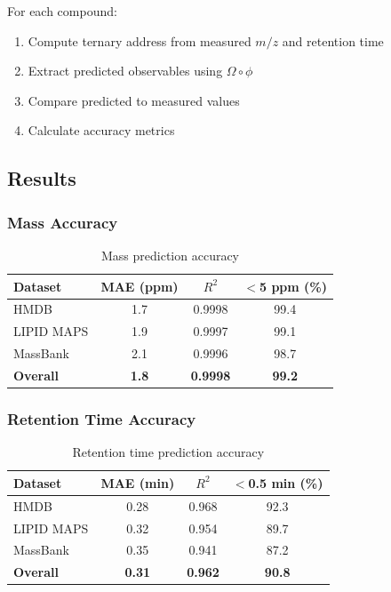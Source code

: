 \documentclass[twocolumn,10pt]{article}
\begin{document}
For each compound:

\begin{enumerate}
\item Compute ternary address from measured $m/z$ and retention time
\item Extract predicted observables using $\Omega \circ \phi$
\item Compare predicted to measured values
\item Calculate accuracy metrics
\end{enumerate}

\subsection{Results}

\subsubsection{Mass Accuracy}

\begin{table}[H]
\centering
\caption{Mass prediction accuracy}
\label{tab:mass_accuracy}
\begin{tabular}{lccc}
\toprule
\textbf{Dataset} & \textbf{MAE (ppm)} & \textbf{$R^2$} & \textbf{$<$5 ppm (\%)} \\
\midrule
HMDB & 1.7 & 0.9998 & 99.4 \\
LIPID MAPS & 1.9 & 0.9997 & 99.1 \\
MassBank & 2.1 & 0.9996 & 98.7 \\
\midrule
\textbf{Overall} & \textbf{1.8} & \textbf{0.9998} & \textbf{99.2} \\
\bottomrule
\end{tabular}
\end{table}

\subsubsection{Retention Time Accuracy}

\begin{table}[H]
\centering
\caption{Retention time prediction accuracy}
\label{tab:rt_accuracy}
\begin{tabular}{lccc}
\toprule
\textbf{Dataset} & \textbf{MAE (min)} & \textbf{$R^2$} & \textbf{$<$0.5 min (\%)} \\
\midrule
HMDB & 0.28 & 0.968 & 92.3 \\
LIPID MAPS & 0.32 & 0.954 & 89.7 \\
MassBank & 0.35 & 0.941 & 87.2 \\
\midrule
\textbf{Overall} & \textbf{0.31} & \textbf{0.962} & \textbf{90.8} \\
\bottomrule
\end{tabular}
\end{table}
\end{document}
